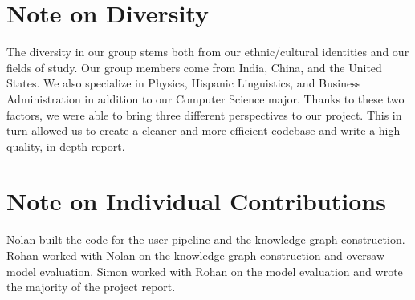 \documentclass[11pt]{article}
\begin{document}
\section*{Note on Diversity}
The diversity in our group stems both from our ethnic/cultural identities and our fields of study. Our group members come from India, China, and the United States. We also specialize in Physics, Hispanic Linguistics, and Business Administration in addition to our Computer Science major. Thanks to these two factors, we were able to bring three different perspectives to our project. This in turn allowed us to create a cleaner and more efficient codebase and write a high-quality, in-depth report.

\section*{Note on Individual Contributions}
Nolan built the code for the user pipeline and the knowledge graph construction. Rohan worked with Nolan on the knowledge graph construction and oversaw model evaluation. Simon worked with Rohan on the model evaluation and wrote the majority of the project report.

%

\end{document}
